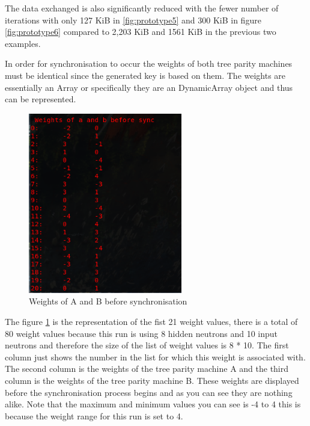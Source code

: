 The data exchanged is also significantly reduced with the fewer number of iterations with only 127 KiB in \ref{fig:prototype5} and 300 KiB in figure \ref{fig:prototype6} compared to 2,203 KiB and 1561 KiB in the previous two examples.

In order for synchronisation to occur the weights of both tree parity machines must be identical since the generated key is based on them. The weights are essentially an Array or specifically they are an DynamicArray object and thus can be represented.

\begin{figure}[!h]
  \centering
      \includegraphics[width=0.6\textwidth]{Figures/proto7.png}
  \caption[Weights of A and B before synchronisation]{Weights of A and B before synchronisation}
  \label{fig:prototype7}
\end{figure}
\FloatBarrier
The figure \ref{fig:prototype7} is the representation of the fist 21 weight values, there is a total of 80 weight values because this run is using 8 hidden neutrons and 10 input neutrons and therefore the size of the list of weight values is 8 * 10. The first column just shows the number in the list for which this weight is associated with. The second column is the weights of the tree parity machine A and the third column is the weights of the tree parity machine B. 
These weights are displayed before the synchronisation process begins and as you can see they are nothing alike. Note that the maximum and minimum values you can see is -4 to 4 this is because the weight range for this run is set to 4.



